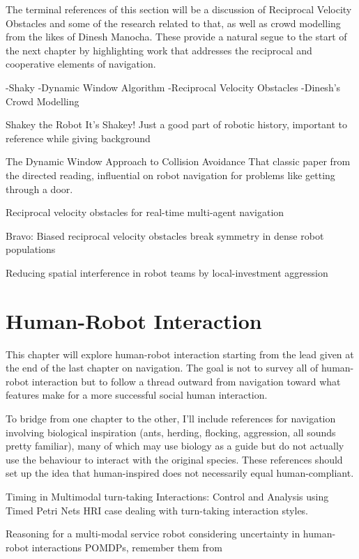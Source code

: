\documentclass{sfuthesis}
\begin{document}
The terminal references of this section will be a discussion of Reciprocal Velocity Obstacles and some of the research related to that, as well as crowd modelling from the likes of Dinesh Manocha. These provide a natural segue to the start of the next chapter by highlighting work that addresses the reciprocal and cooperative elements of navigation.

-Shaky
-Dynamic Window Algorithm
-Reciprocal Velocity Obstacles
-Dinesh's Crowd Modelling

Shakey the Robot	It's Shakey! Just a good part of robotic history, important to reference while giving background

The Dynamic Window Approach to Collision Avoidance	That classic paper from the directed reading, influential on robot navigation for problems like getting through a door.	

Reciprocal velocity obstacles for real-time multi-agent navigation

Bravo: Biased reciprocal velocity obstacles break symmetry in dense robot populations

Reducing spatial interference in robot teams by local-investment aggression

\chapter{Human-Robot Interaction}

This chapter will explore human-robot interaction starting from the lead given at the end of the last chapter on navigation. The goal is not to survey all of human-robot interaction but to follow a thread outward from navigation toward what features make for a more successful social human interaction.

To bridge from one chapter to the other, I'll include references for navigation involving biological inspiration (ants, herding, flocking, aggression, all sounds pretty familiar), many of which may use biology as a guide but do not actually use the behaviour to interact with the original species. These references should set up the idea that human-inspired does not necessarily equal human-compliant.

Timing in Multimodal turn-taking Interactions: Control and Analysis using Timed Petri Nets	HRI case dealing with turn-taking interaction styles.

Reasoning for a multi-modal service robot considering uncertainty in human-robot interactions	POMDPs, remember them from 
\end{document}
